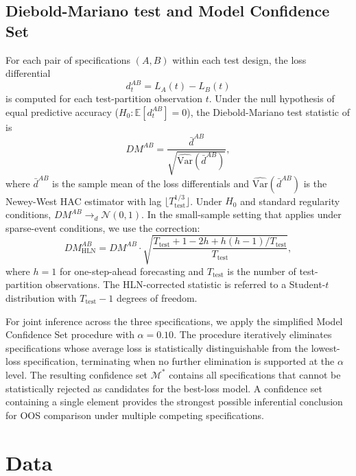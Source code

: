 \documentclass[12pt,a4paper]{article}
\newcommand{\E}{\mathbb{E}}
\theoremstyle{plain}
\theoremstyle{definition}
\begin{document}
\subsection{Diebold-Mariano test and Model Confidence Set}
\label{sec:meth-dm}

For each pair of specifications $(A, B)$ within each test design, the loss differential
\begin{equation}
d_t^{AB} = L_A(t) - L_B(t)
\end{equation}
is computed for each test-partition observation $t$. Under the null hypothesis of equal predictive accuracy ($H_0: \E[d_t^{AB}] = 0$), the Diebold-Mariano test statistic of \cite{diebold1995comparing} is
\begin{equation}
DM^{AB} = \frac{\bar{d}^{AB}}{\sqrt{\widehat{\text{Var}}(\bar{d}^{AB})}},
\label{eq:dm}
\end{equation}
where $\bar{d}^{AB}$ is the sample mean of the loss differentials and $\widehat{\text{Var}}(\bar{d}^{AB})$ is the Newey-West HAC estimator with lag $\lfloor T_{\mathrm{test}}^{1/3} \rfloor$. Under $H_0$ and standard regularity conditions, $DM^{AB} \to_d \mathcal{N}(0, 1)$. In the small-sample setting that applies under sparse-event conditions, we use the \cite{harvey1997testing} correction:
\begin{equation}
DM_{\mathrm{HLN}}^{AB} = DM^{AB} \cdot \sqrt{\frac{T_{\mathrm{test}} + 1 - 2h + h(h-1)/T_{\mathrm{test}}}{T_{\mathrm{test}}}},
\label{eq:dmhln}
\end{equation}
where $h = 1$ for one-step-ahead forecasting and $T_{\mathrm{test}}$ is the number of test-partition observations. The HLN-corrected statistic is referred to a Student-$t$ distribution with $T_{\mathrm{test}} - 1$ degrees of freedom.

For joint inference across the three specifications, we apply the simplified \cite{hansen2011model} Model Confidence Set procedure with $\alpha = 0.10$. The procedure iteratively eliminates specifications whose average loss is statistically distinguishable from the lowest-loss specification, terminating when no further elimination is supported at the $\alpha$ level. The resulting confidence set $\mathcal{M}^*$ contains all specifications that cannot be statistically rejected as candidates for the best-loss model. A confidence set containing a single element provides the strongest possible inferential conclusion for OOS comparison under multiple competing specifications.

\section{Data}
\label{sec:data}
\end{document}
